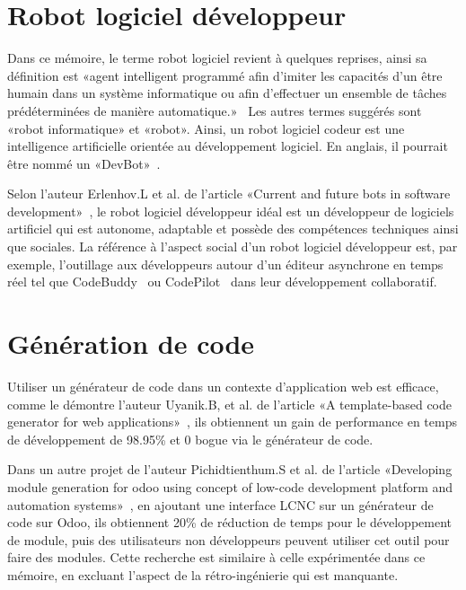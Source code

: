 \label{sec:RevLitt}

\section{Robot logiciel développeur}\label{robot_logiciel_developpeur_revue}

Dans ce mémoire, le terme robot logiciel revient à quelques reprises, ainsi sa définition est «agent intelligent programmé afin d'imiter les capacités d'un être humain dans un système informatique ou afin d'effectuer un ensemble de tâches prédéterminées de manière automatique.»~\cite{robot_logiciel_oqlf_2018} Les autres termes suggérés sont «robot informatique» et «robot». Ainsi, un robot logiciel codeur est une intelligence artificielle orientée au développement logiciel. En anglais, il pourrait être nommé un «DevBot»~\cite{8823643}.

Selon l'auteur Erlenhov.L et al. de l'article «Current and future bots in software development»~\cite{8823643}, le robot logiciel développeur idéal est un développeur de logiciels artificiel qui est autonome, adaptable et possède des compétences techniques ainsi que sociales. La référence à l'aspect social d'un robot logiciel développeur est, par exemple, l'outillage aux développeurs autour d'un éditeur asynchrone en temps réel tel que CodeBuddy~\cite{10.1145/3287324.3293750} ou CodePilot~\cite{10.5555/1030453.1030540} dans leur développement collaboratif.

\section{Génération de code}

Utiliser un générateur de code dans un contexte d'application web est efficace, comme le démontre l'auteur Uyanik.B, et al. de l'article «A template-based code generator for web applications»~\cite{SAHIN2020}, ils obtiennent un gain de performance en temps de développement de 98.95\% et 0 bogue via le générateur de code.

Dans un autre projet de l'auteur Pichidtienthum.S et al. de l'article «Developing module generation for odoo using concept of low-code development platform and automation systems»~\cite{9436754}, en ajoutant une interface LCNC sur un générateur de code sur Odoo, ils obtiennent 20\% de réduction de temps pour le développement de module, puis des utilisateurs non développeurs peuvent utiliser cet outil pour faire des modules. Cette recherche est similaire à celle expérimentée dans ce mémoire, en excluant l'aspect de la rétro-ingénierie qui est manquante.

